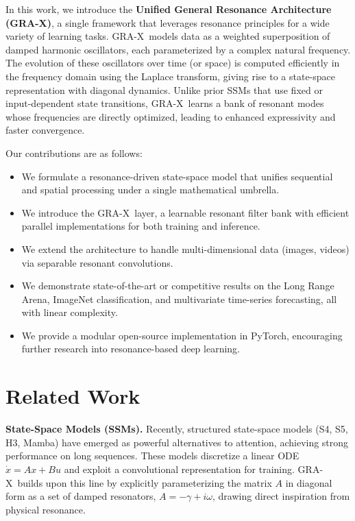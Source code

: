 \documentclass{article}
\newcommand{\GRA}{\textsc{GRA-X}}
\begin{document}
In this work, we introduce the \textbf{Unified General Resonance Architecture (\GRA)}, a single framework that leverages resonance principles for a wide variety of learning tasks.
\GRA\ models data as a weighted superposition of damped harmonic oscillators, each parameterized by a complex natural frequency.
The evolution of these oscillators over time (or space) is computed efficiently in the frequency domain using the Laplace transform, giving rise to a state-space representation with diagonal dynamics.
Unlike prior SSMs that use fixed or input-dependent state transitions, \GRA\ learns a bank of resonant modes whose frequencies are directly optimized, leading to enhanced expressivity and faster convergence.

Our contributions are as follows:
\begin{itemize}
  \item We formulate a resonance-driven state-space model that unifies sequential and spatial processing under a single mathematical umbrella.
  \item We introduce the \GRA\ layer, a learnable resonant filter bank with efficient parallel implementations for both training and inference.
  \item We extend the architecture to handle multi-dimensional data (images, videos) via separable resonant convolutions.
  \item We demonstrate state-of-the-art or competitive results on the Long Range Arena, ImageNet classification, and multivariate time-series forecasting, all with linear complexity.
  \item We provide a modular open-source implementation in PyTorch, encouraging further research into resonance-based deep learning.
\end{itemize}

\section{Related Work}
\label{sec:related}

\textbf{State-Space Models (SSMs).} 
Recently, structured state-space models (S4, S5, H3, Mamba) have emerged as powerful alternatives to attention, achieving strong performance on long sequences.
These models discretize a linear ODE \(\dot{x} = A x + B u\) and exploit a convolutional representation for training.
\GRA\ builds upon this line by explicitly parameterizing the matrix \(A\) in diagonal form as a set of damped resonators, \(A = -\gamma + i\omega\), drawing direct inspiration from physical resonance.
\end{document}
